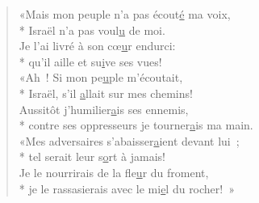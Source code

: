 \begin{verse}
«Mais mon peuple n’a pas écout\underline{é} ma voix, \\*
Israël n’a pas voul\underline{u} de moi. \\
Je l’ai livré à son cœ\underline{u}r endurci: \\*
qu’il aille et su\underline{i}ve ses vues! \\

«Ah ! Si mon pe\underline{u}ple m’écoutait, \\*
Israël, s’il \underline{a}llait sur mes chemins! \\
Aussitôt j’humilier\underline{a}is ses ennemis, \\*
contre ses oppresseurs je tourner\underline{a}is ma main. \\

«Mes adversaires s’abaisser\underline{a}ient devant lui ; \\*
tel serait leur s\underline{o}rt à jamais! \\
Je le nourrirais de la fle\underline{u}r du froment, \\*
je le rassasierais avec le mi\underline{e}l du rocher! » \\
\end{verse}

